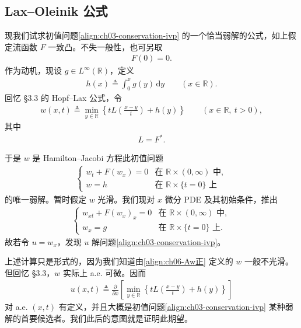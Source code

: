 \documentclass[../../main.tex]{subfiles}
\begin{document}
\subsection{Lax--Oleinik 公式}\label{subsection:ch03-lax-oleinik}

现我们试求初值问题\eqref{align:ch03-conservation-ivp} 的一个恰当弱解的公式，如上假定流函数 $F$ 一致凸。不失一般性，也可另取
\begin{align}\label{align:ch03-F0}
F(0)=0.
\end{align}
作为动机，现设 $g\in L^\infty(\mathbb{R})$，定义
\begin{align}\label{align:ch03-h}
h(x)\triangleq\int_0^x g(y)\,\mathrm{d}y \qquad(x\in\mathbb{R}).
\end{align}
回忆 \S3.3 的 Hopf--Lax 公式，令
\begin{align}\label{align:ch06-Aw正}
w(x,t)\triangleq\min_{y\in\mathbb{R}}\left\{tL\!\left(\frac{x-y}{t}\right)+h(y)\right\} \qquad(x\in\mathbb{R},\ t>0),
\end{align}
其中
\begin{align}\label{align:ch03-L-dual}
L=F^*.
\end{align}

于是 $w$ 是 Hamilton--Jacobi 方程此初值问题
\begin{align}\label{align:ch03-hj-w}
\begin{cases}
w_t+F(w_x)=0 & \text{在 }\mathbb{R}\times(0,\infty)\text{ 中},\\
w=h & \text{在 }\mathbb{R}\times\{t=0\}\text{ 上}
\end{cases}
\end{align}
的唯一弱解。暂时假定 $w$ 光滑。我们现对 $x$ 微分 PDE 及其初始条件，推出
\begin{align*}
\begin{cases}
w_{xt}+F(w_x)_x=0 & \text{在 }\mathbb{R}\times(0,\infty)\text{ 中},\\
w_x=g & \text{在 }\mathbb{R}\times\{t=0\}\text{ 上}.
\end{cases}
\end{align*}
故若令 $u=w_x$，发现 $u$ 解问题\eqref{align:ch03-conservation-ivp}。

上述计算只是形式的，因为我们知道由\eqref{align:ch06-Aw正} 定义的 $w$ 一般不光滑。但回忆 \S3.3，$w$ 实际上 a.e. 可微。因而
\begin{align}\label{align:ch03-u-formal}
u(x,t)\triangleq\frac{\partial}{\partial x}\left[\min_{y\in\mathbb{R}}\left\{tL\!\left(\frac{x-y}{t}\right)+h(y)\right\}\right]
\end{align}
对 a.e. $(x,t)$ 有定义，并且大概是初值问题\eqref{align:ch03-conservation-ivp} 某种弱解的首要候选者。我们此后的意图就是证明此期望。
\end{document}
